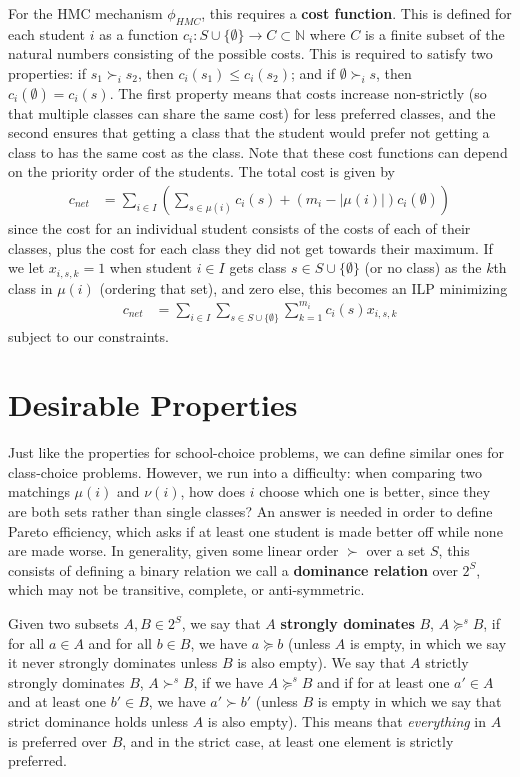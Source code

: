\documentclass[12pt,letterpaper]{extarticle}
\begin{document}
For the HMC mechanism $\phi_{HMC}$, this requires a \textbf{cost function}. This is defined for each student $i$ as a function $c_i : S \cup \{\emptyset\} \to C \subset \mathbb{N}$ where $C$ is a finite subset of the natural numbers consisting of the possible costs. This is required to satisfy two properties: if $s_1 \succ_i s_2$, then $c_i(s_1) \leq c_i(s_2)$; and if $\emptyset \succ_i s$, then $c_i(\emptyset) = c_i(s)$. The first property means that costs increase non-strictly (so that multiple classes can share the same cost) for less preferred classes, and the second ensures that getting a class that the student would prefer not getting a class to has the same cost as the class. Note that these cost functions can depend on the priority order of the students. The total cost is given by
\begin{align*}
    c_{net} &= \sum_{i \in I} \left( \sum_{s \in \mu(i)} c_i(s) + (m_i - |\mu(i)|) c_i(\emptyset) \right)
\end{align*}
since the cost for an individual student consists of the costs of each of their classes, plus the cost for each class they did not get towards their maximum. If we let $x_{i,s,k} = 1$ when student $i \in I$ gets class $s \in S \cup \{\emptyset\}$ (or no class) as the $k$th class in $\mu(i)$ (ordering that set), and zero else, this becomes an ILP \cite{ILP} minimizing
\begin{align*}
    c_{net} &= \sum_{i \in I}\sum_{s \in S\cup \{\emptyset\}} \sum_{k = 1}^{m_i} c_i(s)x_{i,s,k}
\end{align*}
subject to our constraints.

\section{Desirable Properties}

Just like the properties for school-choice problems, we can define similar ones for class-choice problems. However, we run into a difficulty: when comparing two matchings $\mu(i)$ and $\nu(i)$, how does $i$ choose which one is better, since they are both sets rather than single classes? An answer is needed in order to define Pareto efficiency, which asks if at least one student is made better off while none are made worse. In generality, given some linear order $\succ$ over a set $S$, this consists of defining a binary relation we call a \textbf{dominance relation} over $2^S$, which may not be transitive, complete, or anti-symmetric.

Given two subsets $A,B \in 2^S$, we say that $A$ \textbf{strongly dominates} $B$, $A \succcurlyeq^s B$, if for all $a \in A$ and for all $b \in B$, we have $a \succcurlyeq b$ (unless $A$ is empty, in which we say it never strongly dominates unless $B$ is also empty). We say that $A$ strictly strongly dominates $B$, $A \succ^s B$, if we have $A \succcurlyeq^s B$ and if for at least one $a' \in A$ and at least one $b' \in B$, we have $a' \succ b'$ (unless $B$ is empty in which we say that strict dominance holds unless $A$ is also empty). This means that \textit{everything} in $A$ is preferred over $B$, and in the strict case, at least one element is strictly preferred.
\end{document}
